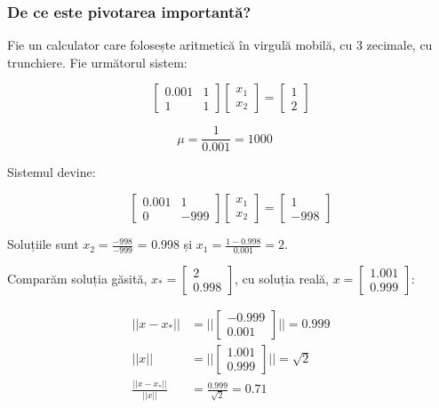 \documentclass{exam}
\begin{document}
\subsubsection{De ce este pivotarea importantă?}

Fie un calculator care folosește aritmetică în virgulă mobilă, cu 3
zecimale, cu trunchiere. Fie următorul sistem:

\begin{equation*}
	\begin{bmatrix}
		0.001 & 1 \\
		      1 & 1
	\end{bmatrix}
	\begin{bmatrix}
		x_1 \\
		x_2
	\end{bmatrix}
	=
	\begin{bmatrix}
		1 \\
		2
	\end{bmatrix}
\end{equation*}

\begin{equation*}
	\mu = \frac{1}{0.001} = 1000 \quad
\end{equation*}

Sistemul devine:

\begin{equation*}
	\begin{bmatrix}
		0.001 & 1 \\
		0     & -999
	\end{bmatrix}
	\begin{bmatrix}
		x_1 \\
		x_2
	\end{bmatrix}
	=
	\begin{bmatrix}
		1 \\
		-998
	\end{bmatrix}
\end{equation*}

Soluțiile sunt $x_2 = \frac{-998}{-999}$ = 0.998 și $x_1 = \frac{1 - 0.998}{0.001} = 2$.

Comparăm soluția găsită, $x_* = \begin{bmatrix} 2 \\ 0.998 \end{bmatrix}$,
cu soluția reală, $x = \begin{bmatrix} 1.001 \\ 0.999 \end{bmatrix}$:

\begin{align*}
	||x - x_*||               & = ||\begin{bmatrix} -0.999 \\ 0.001 \end{bmatrix}|| = 0.999 \\
	||x||                     & = ||\begin{bmatrix} 1.001 \\ 0.999 \end{bmatrix}|| = \sqrt{2}  \\
	\frac{||x - x_*||}{||x||} & = \frac{0.999}{\sqrt{2}} = 0.71
\end{align*}
\end{document}
